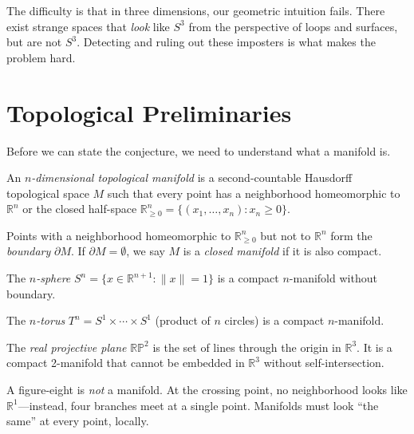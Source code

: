 The difficulty is that in three dimensions, our geometric intuition fails. There exist strange spaces that \emph{look} like $S^3$ from the perspective of loops and surfaces, but are not $S^3$. Detecting and ruling out these imposters is what makes the problem hard.

\section{Topological Preliminaries}

Before we can state the conjecture, we need to understand what a manifold is.

\begin{definition}
An \textit{$n$-dimensional topological manifold} is a second-countable Hausdorff topological space $M$ such that every point has a neighborhood homeomorphic to $\mathbb{R}^n$ or the closed half-space $\mathbb{R}^n_{\ge 0} = \{(x_1, \ldots, x_n) : x_n \ge 0\}$.
\end{definition}

Points with a neighborhood homeomorphic to $\mathbb{R}^n_{\ge 0}$ but not to $\mathbb{R}^n$ form the \textit{boundary} $\partial M$. If $\partial M = \emptyset$, we say $M$ is a \textit{closed manifold} if it is also compact.

\begin{example}
The \textit{$n$-sphere} $S^n = \{x \in \mathbb{R}^{n+1} : \|x\| = 1\}$ is a compact $n$-manifold without boundary.
\end{example}

\begin{example}
The \textit{$n$-torus} $T^n = S^1 \times \cdots \times S^1$ (product of $n$ circles) is a compact $n$-manifold.
\end{example}

\begin{example}
The \textit{real projective plane} $\mathbb{RP}^2$ is the set of lines through the origin in $\mathbb{R}^3$. It is a compact 2-manifold that cannot be embedded in $\mathbb{R}^3$ without self-intersection.
\end{example}

\begin{example}
A figure-eight is \emph{not} a manifold. At the crossing point, no neighborhood looks like $\mathbb{R}^1$---instead, four branches meet at a single point. Manifolds must look ``the same'' at every point, locally.
\end{example}


